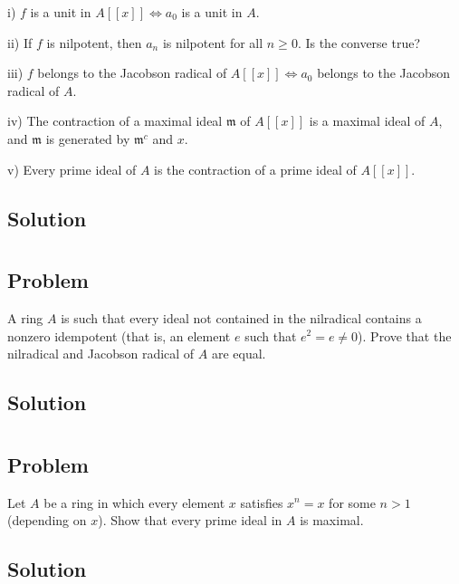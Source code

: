 \documentclass[book,12pt,oneside,openany]{memoir}
\begin{document}
i) $f$ is a unit in $A[[x]] \Leftrightarrow a_0$ is a unit in $A$.

ii) If $f$ is nilpotent, then $a_n$ is nilpotent for all $n \geq 0$. Is the converse true?

iii) $f$ belongs to the Jacobson radical of $A[[x]] \Leftrightarrow a_0$ belongs to the Jacobson radical of $A$.

iv) The contraction of a maximal ideal $\mathfrak{m}$ of $A[[x]]$ is a maximal ideal of $A$, and $\mathfrak{m}$ is generated by $\mathfrak{m}^c$ and $x$.

v) Every prime ideal of $A$ is the contraction of a prime ideal of $A[[x]]$.


\subsection{Solution}

\section{}
\subsection{Problem}
A ring $A$ is such that every ideal not contained in the nilradical contains a nonzero idempotent (that is, an element $e$ such that $e^2 = e \neq 0$). Prove that the nilradical and Jacobson radical of $A$ are equal.
\subsection{Solution}



\section{}
\subsection{Problem}
Let $A$ be a ring in which every element $x$ satisfies $x^n = x$ for some $n > 1$ (depending on $x$). Show that every prime ideal in $A$ is maximal.
\subsection{Solution}



\section{}
\end{document}
